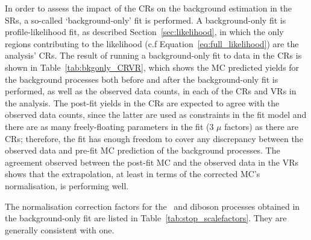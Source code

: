 In order to assess the impact of the CRs on the background estimation in the SRs, a so-called `background-only'
fit is performed.
A background-only fit is profile-likelihood fit, as described Section~\ref{sec:likelihood},
in which the only regions contributing to the likelihood (c.f Equation~\ref{eq:full_likelihood})
are the analysis' CRs.
The result of running a background-only fit to data in the CRs is shown in Table~\ref{tab:bkgonly_CRVR},
which shows the MC predicted yields for the background processes both before and after the
background-only fit is performed, as well as the observed data counts, in each of the CRs and VRs in the analysis.
The post-fit yields in the CRs are expected to agree with the observed data counts, since the latter are used
as constraints in the fit model and there are as many freely-floating parameters in the fit (3 $\mu$ factors)
as there are CRs; therefore, the fit has enough freedom to cover any discrepancy between the observed data and pre-fit MC prediction of
the background processes.
The agreement observed between the post-fit MC and the observed data in the VRs shows that the extrapolation,
at least in terms of the corrected MC's normalisation, is performing well.

The normalisation correction factors for the \ttbar~and diboson processes obtained in the background-only
fit are listed in Table~\ref{tab:stop_scalefactors}.
They are generally consistent with one.

